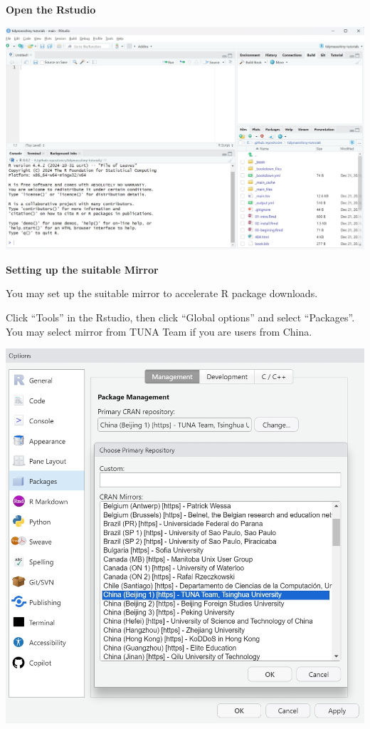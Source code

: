 \documentclass[
]{book}
\begin{document}
\textbf{Open the Rstudio}

\includegraphics{figures/Rstudio.png}

\textbf{Setting up the suitable Mirror}

You may set up the suitable mirror to accelerate R package downloads.

Click ``Tools'' in the Rstudio, then click ``Global options'' and select ``Packages''. You may select mirror from TUNA Team if you are users from China.

\includegraphics{figures/mirror.png}
\end{document}
